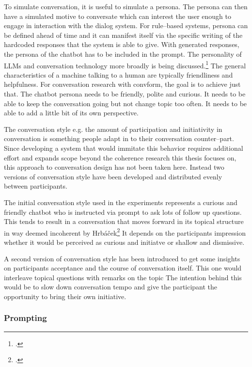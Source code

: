 \documentclass[12pt]{report}
\begin{document}
{To simulate conversation, it is useful to simulate a persona.
The persona can then have a simulated motive to conversate
which can interest the user enough to engage in interaction with the dialog system.
For rule–based systems, persona can be defined ahead of time
and it can manifest itself via the specific writing of the hardcoded responses
that the system is able to give.
With generated responses, the persona of the chatbot has to be included in the prompt.
The personality of LLMs and conversation technology more broadly
is being discussed.\footcite{gpttoxicity, robopersona}
The general characteristics of a machine talking to a human are typically
friendliness and helpfulness.
For conversation research with convform,
the goal is to achieve just that.
The chatbot persona needs to be friendly,
polite and curious.
It needs to be able to keep the conversation going
but not change topic too often.
It needs to be able to add a little bit of its own perspective.
\par
The conversation style e.g. the amount of participation and initiativity in conversation
is something people adapt in to their conversation counter–part.
Since developing a system that would immitate this behavior
requires additional effort
and expands scope beyond the coherence research
this thesis focuses on,
this approach to conversation design
has not been taken here.
Instead two versions of conversation style
have been developed
and distributed evenly between participants.

\par
The initial conversation style used in the experiments
represents a curious and friendly chatbot
who is instructed via prompt to ask lots of follow up questions.
This tends to result in a conversation that moves forward in its topical structure
in way deemed incoherent by Hrbáček\footcite[p.~30]{hrbacek1994}
It depends on the participants impression whether it would be perceived as
curious and initiatve or shallow and dismissive.

\par
A second version of conversation style has been introduced
to get some insights on participants acceptance and
the course of conversation itself.
This one would interleave topical questions with remarks on the topic
The intention behind this would be to slow down conversation tempo
and give the participant the opportunity to bring their own initiative.

\subsubsection{Prompting}

}
\end{document}
